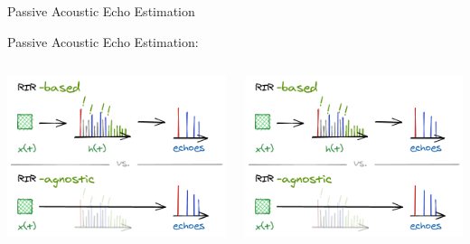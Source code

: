 \begin{frame}{Passive Acoustic Echo Estimation}
\begin{block}{\alert{Passive} Acoustic Echo Estimation:}
        \vspace{.5em}
        \begin{columns}[onlytextwidth] %
            \begin{column}{.48\textwidth}
                \includegraphics[trim={0 31em 0 7em},clip,width=.9\textwidth]{./figures/based-agnostic.png}
            \end{column}
            \begin{column}{.48\textwidth}
                \includegraphics[trim={0 0 0 47em},clip,width=.9\textwidth]{./figures/based-agnostic.png}
            \end{column}%
        \end{columns}


\end{block}
\end{frame}
